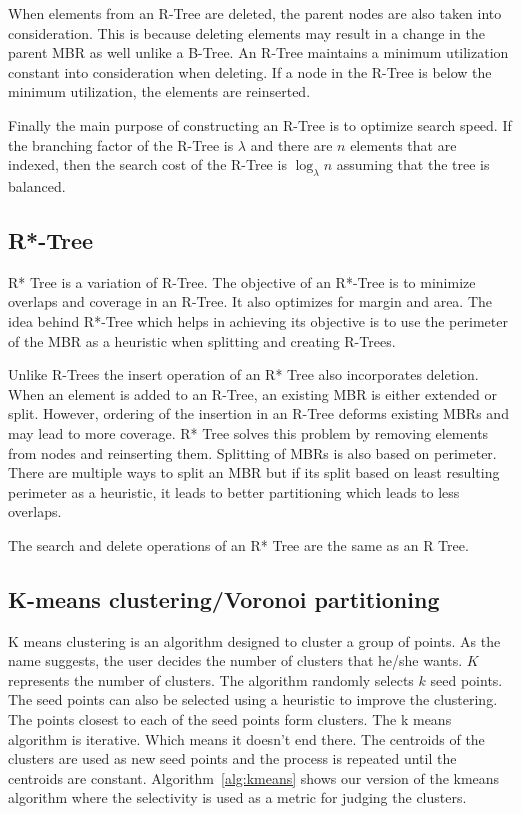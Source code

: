 When elements from an R-Tree are deleted, the parent nodes are also taken into consideration. This is because deleting elements may result in a change in the parent MBR as well unlike a B-Tree. An R-Tree maintains a minimum utilization constant into consideration when deleting. If a node in the R-Tree is below the minimum utilization, the elements are reinserted.

Finally the main purpose of constructing an R-Tree is to optimize search speed. If the branching factor of the R-Tree is $\lambda$ and there are $n$ elements that are indexed, then the search cost of the R-Tree is $\log_{\lambda}{n}$ assuming that the tree is balanced.


\subsection{R*-Tree}
R* Tree is a variation of R-Tree\citep{beckmann1990r}. The objective of an R*-Tree is to minimize overlaps and coverage in an R-Tree. It also optimizes for margin and area. The idea behind R*-Tree which helps in achieving its objective is to use the perimeter of the MBR as a heuristic when splitting and creating R-Trees.

Unlike R-Trees the insert operation of an R* Tree also incorporates deletion. When an element is added to an R-Tree, an existing MBR is either extended or split. However, ordering of the insertion in an R-Tree deforms existing MBRs and may lead to more coverage. R* Tree solves this problem by removing elements from nodes and reinserting them. Splitting of MBRs is also based on perimeter. There are multiple ways to split an MBR but if its split based on least resulting perimeter as a heuristic, it leads to better partitioning which leads to less overlaps.

The search and delete operations of an R* Tree are the same as an R Tree.

\subsection{K-means clustering/Voronoi partitioning}
K means clustering is an algorithm designed to cluster a group of points. As the name suggests, the user decides the number of clusters that he/she wants. $K$ represents the number of clusters. The algorithm randomly selects $k$ seed points. The seed points can also be selected using a heuristic to improve the clustering. The points closest to each of the seed points form clusters. The k means algorithm is iterative. Which means it doesn't end there. The centroids of the clusters are used as new seed points and the process is repeated until the centroids are constant. Algorithm~\ref{alg:kmeans} shows our version of the kmeans algorithm where the selectivity is used as a metric for judging the clusters.

